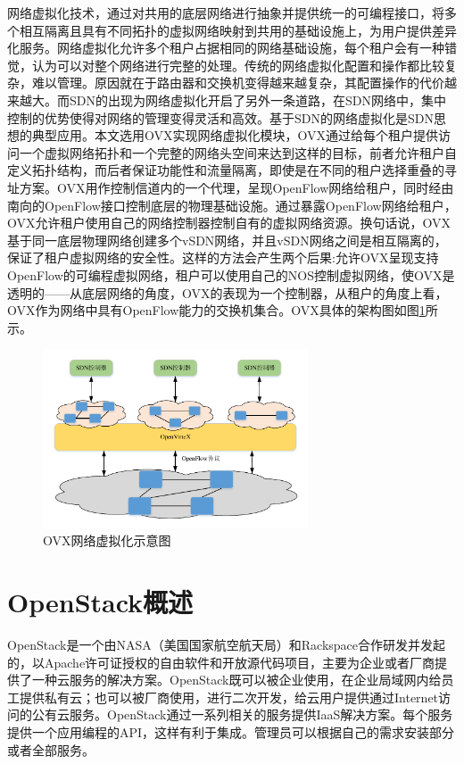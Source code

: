 网络虚拟化技术\cite{Virtual-1}，通过对共用的底层网络进行抽象并提供统一的可编程接口，将多个相互隔离且具有不同拓扑的虚拟网络映射到共用的基础设施上，为用户提供差异化服务。网络虚拟化允许多个租户占据相同的网络基础设施，每个租户会有一种错觉，认为可以对整个网络进行完整的处理。传统的网络虚拟化配置和操作都比较复杂，难以管理。原因就在于路由器和交换机变得越来越复杂，其配置操作的代价越来越大。而SDN的出现为网络虚拟化开启了另外一条道路，在SDN网络中，集中控制的优势使得对网络的管理变得灵活和高效。基于SDN的网络虚拟化是SDN思想的典型应用。本文选用OVX实现网络虚拟化模块，OVX通过给每个租户提供访问一个虚拟网络拓扑和一个完整的网络头空间来达到这样的目标，前者允许租户自定义拓扑结构，而后者保证功能性和流量隔离，即使是在不同的租户选择重叠的寻址方案。OVX用作控制信道内的一个代理，呈现OpenFlow网络给租户，同时经由南向的OpenFlow接口控制底层的物理基础设施。通过暴露OpenFlow网络给租户，OVX允许租户使用自己的网络控制器控制自有的虚拟网络资源。换句话说，OVX基于同一底层物理网络创建多个vSDN网络，并且vSDN网络之间是相互隔离的，保证了租户虚拟网络的安全性。这样的方法会产生两个后果:允许OVX呈现支持OpenFlow的可编程虚拟网络，租户可以使用自己的NOS控制虚拟网络，使OVX是透明的——从底层网络的角度，OVX的表现为一个控制器，从租户的角度上看，OVX作为网络中具有OpenFlow能力的交换机集合\cite{OVX-2}。OVX具体的架构图如图\ref{fig:ovx}所示。

\begin{figure}[!htb]
  \centering
  \includegraphics[width=0.7\textwidth]{logo/ovx}
  \caption{OVX网络虚拟化示意图}
  \label{fig:ovx}
\end{figure}

\section{OpenStack概述}

OpenStack是一个由NASA（美国国家航空航天局）和Rackspace合作研发并发起的，以Apache许可证授权的自由软件和开放源代码项目，主要为企业或者厂商提供了一种云服务的解决方案。OpenStack既可以被企业使用，在企业局域网内给员工提供私有云；也可以被厂商使用，进行二次开发，给云用户提供通过Internet访问的公有云服务。OpenStack通过一系列相关的服务提供IaaS解决方案。每个服务提供一个应用编程的API，这样有利于集成。管理员可以根据自己的需求安装部分或者全部服务。

